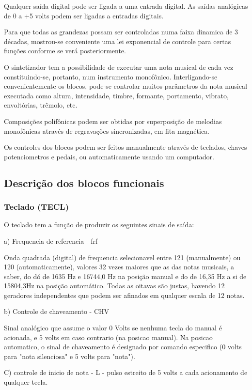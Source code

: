 \documentclass{article}
\begin{document}
Qualquer saída digital pode ser ligada a uma entrada digital. As saídas analógicas de 0 a +5 volts podem ser ligadas a entradas digitais.

Para que todas as grandezas possam ser controladas numa faixa dinamica de 3 décadas, mostrou-se conveniente uma lei exponencial de controle para certas funções conforme se verá posteriormente.

O sintetizador tem a possibilidade de executar uma nota musical de cada vez constituindo-se, portanto, num instrumento monofônico. Interligando-se convenientemente os blocos, pode-se controlar muitos parâmetros da nota musical executada como altura, intensidade, timbre, formante, portamento, vibrato, envoltórias, trêmolo, etc.

Composições polifônicas podem ser obtidas por superposição de melodias monofônicas através de regravações sincronizadas, em fita magnética.

Os controles dos blocos podem ser feitos manualmente através de teclados, chaves potenciometros e pedais, ou automaticamente usando um computador.

\subsection{Descrição dos blocos funcionais}
\subsubsection{Teclado (TECL)}

O teclado tem a função de produzir os seguintes sinais de saída:

a) Frequencia de referencia - frf

Onda quadrada (digital) de frequencia selecionavel entre 121 (manualmente) ou 120 (automaticamente), valores 32 vezes maiores que as das notas musicais, a saber, do dó de 1635 Hz e 16744,0 Hz na posição manual e do de 16,35 Hz a si de 15804,3Hz na posição automático. Todas as oitavas são justas, havendo 12 geradores independentes que podem ser afinados em qualquer escala de 12 notas.

b) Controle de chaveamento - CHV

Sinal analógico que assume o valor 0 Volts se nenhuma tecla do manual é acionada, e 5 volts em caso contrario (na posicao manual). Na posicao automatico, o sinal de chaveamento é designado por comando especifico (0 volts para "nota silenciosa" e 5 volts para "nota").

C) controle de inicio de nota - L -
pulso estreito de 5 volts a cada acionamento de qualquer tecla.
\end{document}
